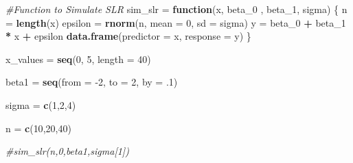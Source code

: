 \documentclass[
]{article}
\newenvironment{Shaded}{\begin{snugshade}}{\end{snugshade}}
\newcommand{\CommentTok}[1]{\textcolor[rgb]{0.56,0.35,0.01}{\textit{#1}}}
\newcommand{\ControlFlowTok}[1]{\textcolor[rgb]{0.13,0.29,0.53}{\textbf{#1}}}
\newcommand{\DataTypeTok}[1]{\textcolor[rgb]{0.13,0.29,0.53}{#1}}
\newcommand{\DecValTok}[1]{\textcolor[rgb]{0.00,0.00,0.81}{#1}}
\newcommand{\FloatTok}[1]{\textcolor[rgb]{0.00,0.00,0.81}{#1}}
\newcommand{\KeywordTok}[1]{\textcolor[rgb]{0.13,0.29,0.53}{\textbf{#1}}}
\newcommand{\NormalTok}[1]{#1}
\newcommand{\OperatorTok}[1]{\textcolor[rgb]{0.81,0.36,0.00}{\textbf{#1}}}
\newcommand{\StringTok}[1]{\textcolor[rgb]{0.31,0.60,0.02}{#1}}
\begin{document}
\begin{Shaded}
\begin{Highlighting}[]
\CommentTok{#Function to Simulate SLR}
\NormalTok{sim_slr =}\StringTok{ }\ControlFlowTok{function}\NormalTok{(x, beta_}\DecValTok{0}\NormalTok{ , beta_}\DecValTok{1}\NormalTok{, sigma) \{}
\NormalTok{  n =}\StringTok{ }\KeywordTok{length}\NormalTok{(x)}
\NormalTok{  epsilon =}\StringTok{ }\KeywordTok{rnorm}\NormalTok{(n, }\DataTypeTok{mean =} \DecValTok{0}\NormalTok{, }\DataTypeTok{sd =}\NormalTok{ sigma)}
\NormalTok{  y =}\StringTok{ }\NormalTok{beta_}\DecValTok{0} \OperatorTok{+}\StringTok{ }\NormalTok{beta_}\DecValTok{1} \OperatorTok{*}\StringTok{ }\NormalTok{x }\OperatorTok{+}\StringTok{ }\NormalTok{epsilon}
  \KeywordTok{data.frame}\NormalTok{(}\DataTypeTok{predictor =}\NormalTok{ x, }\DataTypeTok{response =}\NormalTok{ y)}
\NormalTok{\}}

\NormalTok{x_values =}\StringTok{ }\KeywordTok{seq}\NormalTok{(}\DecValTok{0}\NormalTok{, }\DecValTok{5}\NormalTok{, }\DataTypeTok{length =} \DecValTok{40}\NormalTok{)}

\NormalTok{beta1 =}\StringTok{ }\KeywordTok{seq}\NormalTok{(}\DataTypeTok{from =} \DecValTok{-2}\NormalTok{, }\DataTypeTok{to =} \DecValTok{2}\NormalTok{, }\DataTypeTok{by =} \FloatTok{.1}\NormalTok{)}

\NormalTok{sigma =}\StringTok{ }\KeywordTok{c}\NormalTok{(}\DecValTok{1}\NormalTok{,}\DecValTok{2}\NormalTok{,}\DecValTok{4}\NormalTok{)}

\NormalTok{n =}\StringTok{ }\KeywordTok{c}\NormalTok{(}\DecValTok{10}\NormalTok{,}\DecValTok{20}\NormalTok{,}\DecValTok{40}\NormalTok{)}

\CommentTok{#sim_slr(n,0,beta1,sigma[1])}
\end{Highlighting}
\end{Shaded}
\end{document}
